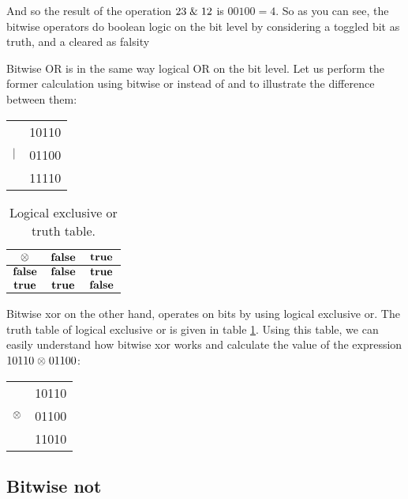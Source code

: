 And so the result of the operation $23 \mathrel{\&} 12$ is $00100=4$. So as
you can see, the bitwise operators do boolean logic on the bit level
by considering a toggled bit as truth, and a cleared as falsity

Bitwise OR is in the same way logical OR on the bit level. Let us
perform the former calculation using bitwise or instead of and to
illustrate the difference between them:

\begin{center}
  \begin{tabular}{lr}
             & 10110  \\
    $\mathrel{|}$ & 01100 \\
    \hline
    & 11110 \\
  \end{tabular}
\end{center}

\begin{table}
  \centering
    \begin{tabular}{|c|c|c|}
      \hline
      $\mathbf{\mathrel{\otimes}}$ & $\mathbf{\textbf{false}}$ & $\mathbf{\textbf{true}}$ \\ \hline
      $\mathbf{\textbf{false}}$ & $\mathbf{\textbf{false}}$ & $\mathbf{\textbf{true}}$ \\ \hline
      $\mathbf{\textbf{true}}$ & $\mathbf{\textbf{true}}$ & $\mathbf{\textbf{false}}$ \\ \hline
    \end{tabular}
  \caption{Logical exclusive or truth table.}
  \label{tab:log-exlusive-or-table}
\end{table}

Bitwise xor on the other hand, operates on bits by using logical
exclusive or. The truth table of logical exclusive or is given in
table \ref{tab:log-exlusive-or-table}. Using this table, we can easily
understand how bitwise xor works and calculate the value of the
expression $10110 \mathrel{\otimes} 01100$:

\begin{center}
  \begin{tabular}{lr}
              & 10110  \\
    $\mathrel{\otimes}$ & 01100 \\
    \hline
              & 11010 \\
  \end{tabular}
\end{center}

\subsection{Bitwise not}


